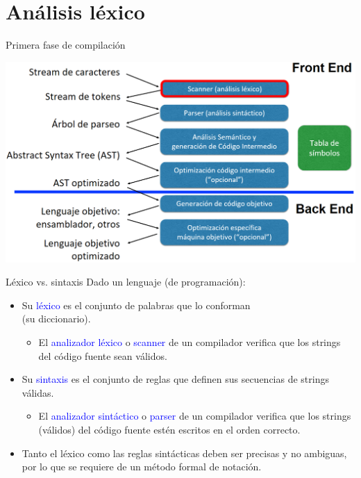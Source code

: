 \documentclass[handout]{beamer} %
\newcommand{\blue}[1]{\textcolor{blue}{#1}}
\begin{document}

\section{Análisis léxico}

\begin{frame}{Primera fase de compilación}
    \begin{center}
    \includegraphics[width=\textwidth]{./image/cap2/compilador-fase1}
    \end{center}
\end{frame}

\begin{frame}{Léxico vs. sintaxis}
    Dado un lenguaje (de programación):
    \begin{itemize}
        \item<1-> Su \blue{léxico} es el conjunto de palabras que lo conforman\\
        (su diccionario).
        \begin{itemize}
            \item<2-> El \blue{analizador léxico} o \blue{scanner} de un compilador verifica que los strings del código fuente sean válidos.
        \end{itemize}
        \item<3-> Su \blue{sintaxis} es el conjunto de reglas que definen sus secuencias de strings válidas.
        \begin{itemize}
            \item<4-> El \blue{analizador sintáctico} o \blue{parser} de un compilador verifica que los strings (válidos) del código fuente estén escritos en el orden correcto.
        \end{itemize}
        \item<5-> Tanto el léxico como las reglas sintácticas deben ser precisas y no ambiguas, por lo que se requiere de un método formal de notación.
    \end{itemize}
\end{frame}
\end{document}
